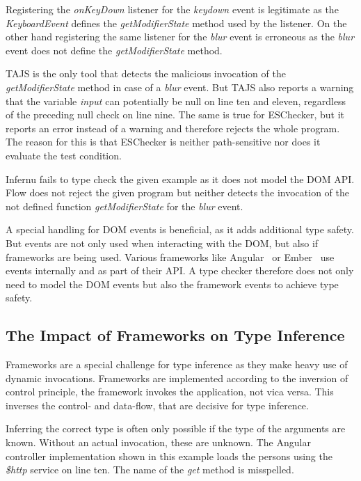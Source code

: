 
Registering the \textit{onKeyDown} listener for the \textit{keydown} event is legitimate as the \textit{KeyboardEvent} defines the \textit{getModifierState} method used by the listener. On the other hand registering the same listener for the \textit{blur} event is erroneous as the \textit{blur} event does not define the \textit{getModifierState} method. 

TAJS is the only tool that detects the malicious invocation of the \textit{getModifierState} method in case of a \textit{blur} event. But TAJS also reports a warning that the variable \textit{input} can potentially be null on line ten and eleven, regardless of the preceding null check on line nine. The same is true for ESChecker, but it reports an error instead of a warning and therefore rejects the whole program. The reason for this is that ESChecker is neither path-sensitive nor does it evaluate the test condition. 

Infernu fails to type check the given example as it does not model the DOM API. Flow does not reject the given program but neither detects the invocation of the not defined function \textit{getModifierState} for the \textit{blur} event. 

A special handling for DOM events is beneficial, as it adds additional type safety. But events are not only used when interacting with the DOM, but also if frameworks are being used. Various frameworks like Angular~\cite{Angular} or Ember~\cite{Ember} use events internally and as part of their API. A type checker therefore does not only need to model the DOM events but also the framework events to achieve type safety.

\subsection{The Impact of Frameworks on Type Inference}
Frameworks are a special challenge for type inference as they make heavy use of dynamic invocations.  Frameworks are implemented according to the inversion of control principle, the framework invokes the application, not vica versa. This inverses the control- and data-flow, that are decisive for type inference. 

Inferring the correct type is often only possible if the type of the arguments are known. Without an actual invocation, these are unknown. The Angular~\cite{Angular} controller implementation shown in this example loads the persons using the \textit{\$http} service on line ten. The name of the \textit{get} method is misspelled. 

